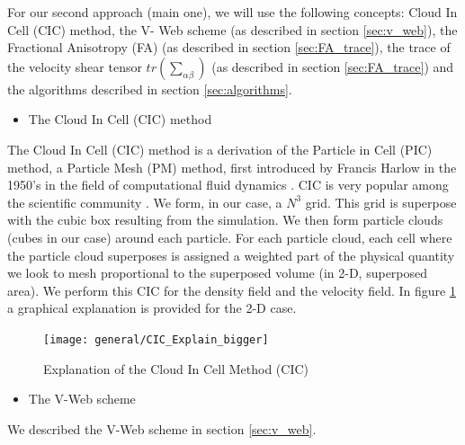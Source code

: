 \documentclass[12pt]{article}
\begin{document}
\begin{par}
For our second approach (main one), we will use the
 following concepts: Cloud In Cell (CIC) method, the V-
 Web scheme (as described in section \ref{sec:v_web}),
  the Fractional Anisotropy (FA) (as described in
   section \ref{sec:FA_trace}), the trace of the
    velocity shear tensor $tr\left(\sum_{\alpha
     \beta}\right)$ (as described in section
      \ref{sec:FA_trace}) and the algorithms described
       in section \ref{sec:algorithms}.\\
\end{par}


\begin{itemize}
\item The Cloud In Cell (CIC) method
\end{itemize}
\begin{par}
The Cloud In Cell (CIC) method is a derivation of the
 Particle in Cell (PIC) method, a Particle Mesh (PM)
  method, first introduced by Francis Harlow in the
   1950's in the field of computational fluid dynamics
    \cite{harlow1964particle}. CIC is very popular
     among the scientific community
      \cite{grigoryev_numerical_2002}. We form, in our
       case, a $N^3$ grid. This grid is superpose with
        the cubic
      box resulting from the simulation. We then form
       particle clouds (cubes in our case) around each
        particle. For each particle cloud, each cell
         where the particle cloud superposes is
          assigned a weighted part of the physical
           quantity we look to mesh proportional to the
            superposed volume (in 2-D, superposed
             area). We perform this CIC
            for the density field and the velocity
             field. In figure \ref{fg:cic_explain} a
              graphical explanation is provided for the
               2-D case.  \\
\end{par}

\begin{figure}[ht]
\begin{center}
\texttt{[image: general/CIC\_Explain\_bigger]} %
\caption{Explanation of the Cloud In Cell Method (CIC)}
\label{fg:cic_explain}
\end{center}
\end{figure}
\FloatBarrier

\begin{itemize}
\item The V-Web scheme
\end{itemize}
\begin{par}
We described the V-Web scheme in section \ref{sec:v_web}.\\ %
\end{par}
\end{document}
